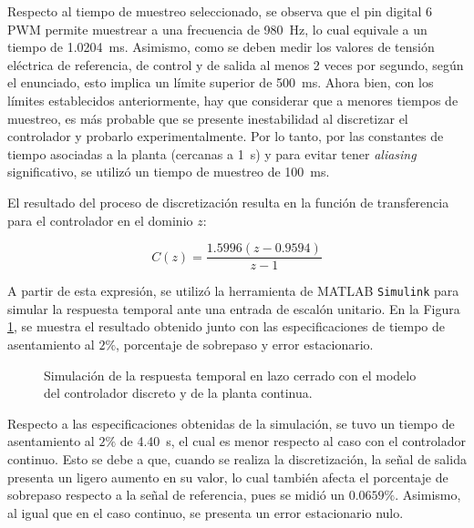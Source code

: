 Respecto al tiempo de muestreo seleccionado, se observa que el pin digital 6 PWM permite muestrear a una frecuencia de \SI{980}{\hertz}, lo cual equivale a un tiempo de \SI{1.0204}{\milli\second}.
Asimismo, como se deben medir los valores de tensión eléctrica de referencia, de control y de salida al menos 2 veces por segundo, según el enunciado, esto implica un límite superior de \SI{500}{\milli\second}.
Ahora bien, con los límites establecidos anteriormente, hay que considerar que a menores tiempos de muestreo, es más probable que se presente inestabilidad al discretizar el controlador y probarlo experimentalmente.
Por lo tanto, por las constantes de tiempo asociadas a la planta (cercanas a \SI{1}{\second}) y para evitar tener \textit{aliasing} significativo, se utilizó un tiempo de muestreo de \SI{100}{\milli\second}.\cite{b2}

El resultado del proceso de discretización resulta en la función de transferencia para el controlador en el dominio $z$:

\begin{equation} \label{eq:controlador_discreto}
    C(z) = \frac{1.5996 \left( z - 0.9594 \right)}{z-1}
\end{equation}

A partir de esta expresión, se utilizó la herramienta de MATLAB \texttt{Simulink} para simular la respuesta temporal ante una entrada de escalón unitario.
En la Figura \ref{fig:respuesta-temporal-discreta}, se muestra el resultado obtenido junto con las especificaciones de tiempo de asentamiento al $2\%$, porcentaje de sobrepaso y error estacionario.

\begin{figure}[htbp]
    \centering
    \caption{Simulación de la respuesta temporal en lazo cerrado con el modelo del controlador discreto y de la planta continua.}
    \label{fig:respuesta-temporal-discreta}
\end{figure}

Respecto a las especificaciones obtenidas de la simulación, se tuvo un tiempo de asentamiento al $2\%$ de \SI{4.40}{\second}, el cual es menor respecto al caso con el controlador continuo.
Esto se debe a que, cuando se realiza la discretización, la señal de salida presenta un ligero aumento en su valor, lo cual también afecta el porcentaje de sobrepaso respecto a la señal de referencia, pues se midió un $0.0659\%$.
Asimismo, al igual que en el caso continuo, se presenta un error estacionario nulo.

